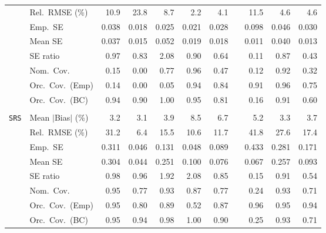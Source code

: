\begin{landscape}
\begin{longtable}{llrrrrrrrrr}
 & Rel.\ RMSE (\%) & 10.9 & 23.8 & 8.7 & \cellcolor{rankone}2.2 & \cellcolor{ranktwo}4.1 &  & 11.5 & \cellcolor{rankthree}4.6 & \cellcolor{rankthree}4.6 \\
 & Emp.\ SE & 0.038 & 0.018 & 0.025 & 0.021 & 0.028 &  & 0.098 & 0.046 & 0.030 \\
 & Mean SE & 0.037 & 0.015 & 0.052 & 0.019 & 0.018 &  & 0.011 & 0.040 & 0.013 \\
 & SE ratio & \cellcolor{rankone}0.97 & 0.83 & 2.08 & \cellcolor{ranktwo}0.90 & 0.64 &  & 0.11 & \cellcolor{rankthree}0.87 & 0.43 \\
 & Nom.\ Cov. & 0.15 & 0.00 & \cellcolor{rankthree}0.77 & \cellcolor{rankone}0.96 & 0.47 &  & 0.12 & \cellcolor{ranktwo}0.92 & 0.32 \\
 & Orc.\ Cov.\ (Emp) & 0.14 & 0.00 & 0.05 & \cellcolor{rankone}0.94 & \cellcolor{rankthree}0.84 &  & \cellcolor{ranktwo}0.91 & \cellcolor{rankone}0.96 & 0.75 \\
 & Orc.\ Cov.\ (BC) & \cellcolor{ranktwo}0.94 & 0.90 & 1.00 & \cellcolor{rankone}0.95 & 0.81 &  & 0.16 & \cellcolor{rankthree}0.91 & 0.60 \\
\addlinespace[2pt]
\multicolumn{11}{l}{\textbf{Binary \& Categorical Phase-One Covariates}} \\
\addlinespace[2pt]
\quad \texttt{SRS} & Mean $|$Bias$|$ (\%) & \cellcolor{ranktwo}3.2 & \cellcolor{rankone}3.1 & 3.9 & 8.5 & 6.7 &  & 5.2 & \cellcolor{rankthree}3.3 & 3.7 \\
 & Rel.\ RMSE (\%) & 31.2 & \cellcolor{rankone}6.4 & 15.5 & \cellcolor{ranktwo}10.6 & \cellcolor{rankthree}11.7 &  & 41.8 & 27.6 & 17.4 \\
 & Emp.\ SE & 0.311 & 0.046 & 0.131 & 0.048 & 0.089 &  & 0.433 & 0.281 & 0.171 \\
 & Mean SE & 0.304 & 0.044 & 0.251 & 0.100 & 0.076 &  & 0.067 & 0.257 & 0.093 \\
 & SE ratio & \cellcolor{rankone}0.98 & \cellcolor{ranktwo}0.96 & 1.92 & 2.08 & 0.85 &  & 0.15 & \cellcolor{rankthree}0.91 & 0.54 \\
 & Nom.\ Cov. & \cellcolor{rankone}0.95 & 0.77 & \cellcolor{ranktwo}0.93 & \cellcolor{rankthree}0.87 & 0.77 &  & 0.24 & \cellcolor{ranktwo}0.93 & 0.71 \\
 & Orc.\ Cov.\ (Emp) & \cellcolor{rankone}0.95 & 0.80 & \cellcolor{rankthree}0.89 & 0.52 & 0.87 &  & \cellcolor{ranktwo}0.96 & \cellcolor{rankone}0.95 & \cellcolor{ranktwo}0.94 \\
 & Orc.\ Cov.\ (BC) & \cellcolor{rankone}0.95 & \cellcolor{ranktwo}0.94 & 0.98 & 1.00 & 0.90 &  & 0.25 & \cellcolor{rankthree}0.93 & 0.71 \\

\end{longtable}
\end{landscape}
